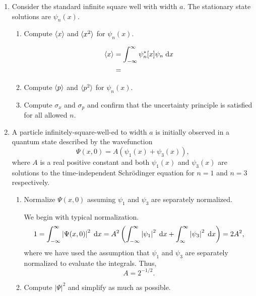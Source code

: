 \documentclass[a4paper, 12pt]{config/homework}
\begin{document}
\begin{enumerate}
\begin{enumerate}[label=(\alph*)]
\end{enumerate}

\pagebreak
\item Consider the standard infinite square well with width \(a\). The stationary state solutions are \(\psi_n(x)\).
\begin{enumerate}[label=(\alph*)]
\item Compute \(\braket{x}\) and \(\braket{x^2}\) for \(\psi_n(x)\).

\begin{align*}
\braket{x} &= \bint{-\infty}{\infty}{\psi_n^* [x] \psi_n}{x}
\\&= 
\end{align*}

\item Compute \(\braket{p}\) and \(\braket{p^2}\) for \(\psi_n(x)\).

\item Compute \(\sigma_x\) and \(\sigma_p\) and confirm that the uncertainty principle is satisfied for all allowed \(n\).

\end{enumerate}

\pagebreak
\item A particle infinitely-square-well-ed to width \(a\) is initially observed in a quantum state described by the wavefunction
\[\Psi(x,0) = A \left(\psi_1(x) + \psi_3(x)\right),\]
where \(A\) is a real positive constant and both \(\psi_1(x)\) and \(\psi_3(x)\) are solutions to the time-independent Schr{\"o}dinger equation for \(n=1\) and \(n=3\) respectively.
\begin{enumerate}[label=(\alph*)]
\item Normalize \(\Psi(x,0)\) assuming \(\psi_1\) and \(\psi_3\) are separately normalized.

We begin with typical normalization.
\[1 = \bint{-\infty}{\infty}{\left|\Psi(x,0)\right|^2}{x} = A^2\left( \bint{-\infty}{\infty}{\left|\psi_1\right|^2}{x} + \bint{\infty}{\infty}{\left|\psi_3\right|^2}{x}\right) = 2A^2,\]
where we have used the assumption that \(\psi_1\) and \(\psi_3\) are separately normalized to evaluate the integrals. Thus,
\[A = 2^{-1/2}.\]

\item Compute \(\left|\Psi\right|^2\) and simplify as much as possible.


\end{enumerate}
\end{enumerate}
\end{document}
